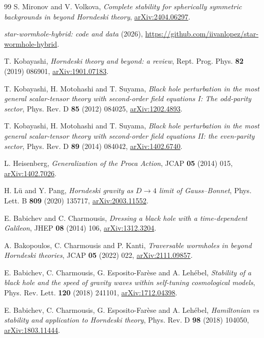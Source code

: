 \documentclass[11pt,a4paper]{article}
\theoremstyle{remark}
\begin{document}
\begin{thebibliography}{99}
 S. Mironov and V. Volkova, \emph{Complete stability for spherically symmetric backgrounds in beyond Horndeski theory}, \href{https://arxiv.org/abs/2404.06297}{arXiv:2404.06297}.

 \emph{star-wormhole-hybrid: code and data} (2026), \url{https://github.com/iivanlopez/star-wormhole-hybrid}.

 T. Kobayashi, \emph{Horndeski theory and beyond: a review}, Rept. Prog. Phys. \textbf{82} (2019) 086901, \href{https://arxiv.org/abs/1901.07183}{arXiv:1901.07183}.

 T. Kobayashi, H. Motohashi and T. Suyama, \emph{Black hole perturbation in the most general scalar-tensor theory with second-order field equations I: The odd-parity sector}, Phys. Rev. D \textbf{85} (2012) 084025, \href{https://arxiv.org/abs/1202.4893}{arXiv:1202.4893}.

 T. Kobayashi, H. Motohashi and T. Suyama, \emph{Black hole perturbation in the most general scalar-tensor theory with second-order field equations II: the even-parity sector}, Phys. Rev. D \textbf{89} (2014) 084042, \href{https://arxiv.org/abs/1402.6740}{arXiv:1402.6740}.

 L. Heisenberg, \emph{Generalization of the Proca Action}, JCAP \textbf{05} (2014) 015, \href{https://arxiv.org/abs/1402.7026}{arXiv:1402.7026}.

 H. Lü and Y. Pang, \emph{Horndeski gravity as $D\to4$ limit of Gauss--Bonnet}, Phys. Lett. B \textbf{809} (2020) 135717, \href{https://arxiv.org/abs/2003.11552}{arXiv:2003.11552}.

 E. Babichev and C. Charmousis, \emph{Dressing a black hole with a time-dependent Galileon}, JHEP \textbf{08} (2014) 106, \href{https://arxiv.org/abs/1312.3204}{arXiv:1312.3204}.

 A. Bakopoulos, C. Charmousis and P. Kanti, \emph{Traversable wormholes in beyond Horndeski theories}, JCAP \textbf{05} (2022) 022, \href{https://arxiv.org/abs/2111.09857}{arXiv:2111.09857}.

 E. Babichev, C. Charmousis, G. Esposito-Farèse and A. Lehébel, \emph{Stability of a black hole and the speed of gravity waves within self-tuning cosmological models}, Phys. Rev. Lett. \textbf{120} (2018) 241101, \href{https://arxiv.org/abs/1712.04398}{arXiv:1712.04398}.

 E. Babichev, C. Charmousis, G. Esposito-Farèse and A. Lehébel, \emph{Hamiltonian vs stability and application to Horndeski theory}, Phys. Rev. D \textbf{98} (2018) 104050, \href{https://arxiv.org/abs/1803.11444}{arXiv:1803.11444}.


\end{thebibliography}
\end{document}
